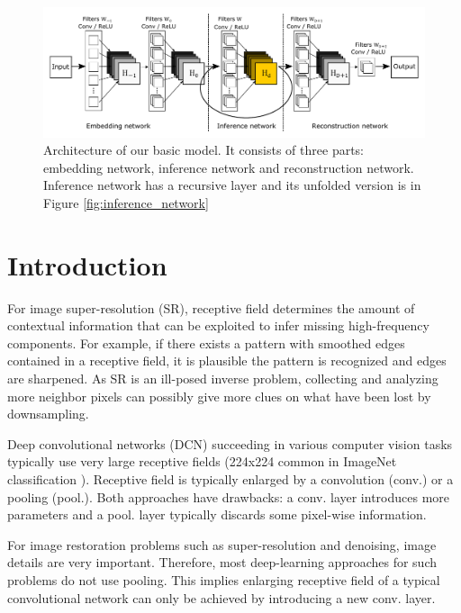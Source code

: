 \documentclass[10pt,twocolumn,letterpaper]{article}
\begin{document}
\begin{figure}[t]
	\includegraphics[width=\textwidth]{figs/f1}
	\caption {Architecture of our basic model. It consists of three parts: embedding network, inference network and reconstruction network. Inference network has a recursive layer and its unfolded version is in Figure \ref{fig:inference_network}}
	\label{fig:overview}
\end{figure}


\section{Introduction}
For image super-resolution (SR), receptive field determines the amount of contextual information that can be exploited to infer missing high-frequency components. For example, if there exists a pattern with smoothed edges contained in a receptive field, it is plausible the pattern is recognized and edges are sharpened. As SR is an ill-posed inverse problem, collecting and analyzing more neighbor pixels can possibly give more clues on what have been lost by downsampling. 

Deep convolutional networks (DCN) succeeding in various computer vision tasks typically use very large receptive fields  (224x224 common in ImageNet classification \cite{krizhevsky2012imagenet, simonyan2015very}). Receptive field is typically enlarged by a convolution (conv.) or a pooling (pool.).  Both approaches have drawbacks: a conv. layer introduces more parameters and a pool. layer typically discards some pixel-wise information. 


For image restoration problems such as super-resolution and denoising, image details are very important. Therefore, most deep-learning approaches for such problems do not use pooling. This implies enlarging receptive field of a typical convolutional network can only be achieved by introducing a new conv. layer.
\end{document}
